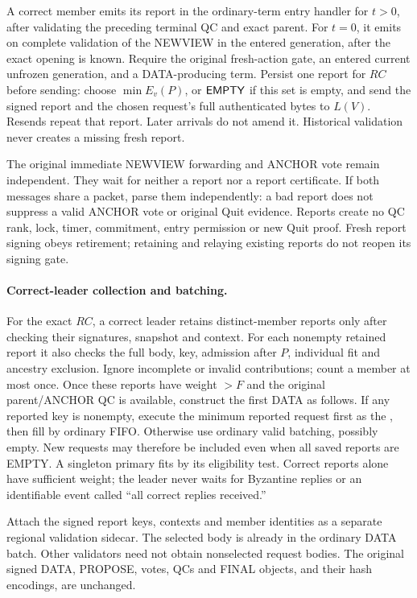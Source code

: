 A correct member emits its report in the ordinary-term entry handler
for $t>0$, after validating the preceding terminal QC and exact parent.
For $t=0$, it emits on complete validation of the NEWVIEW in the entered
generation, after the exact opening is known. Require the original
fresh-action gate, an entered current unfrozen generation, and a
DATA-producing term. Persist one report for $\mathit{RC}$ before sending:
choose $\min E_v(P)$, or $\mathsf{EMPTY}$ if this set is empty, and send the
signed report and the chosen request's full authenticated bytes to
$L(V)$. Resends repeat that report. Later arrivals do not amend it.
Historical validation never creates a missing fresh report.

The original immediate NEWVIEW forwarding and ANCHOR vote remain
independent. They wait for neither a report nor a report certificate.
If both messages share a packet, parse them independently: a bad report
does not suppress a valid ANCHOR vote or original Quit evidence.
Reports create no QC rank, lock, timer, commitment, entry permission or
new Quit proof. Fresh report signing obeys retirement; retaining and
relaying existing reports do not reopen its signing gate.

\paragraph{Correct-leader collection and batching.}
For the exact $\mathit{RC}$, a correct leader retains distinct-member
reports only after checking their signatures, snapshot and context.
For each nonempty retained report it also checks the full body, key,
admission after $P$, individual fit and ancestry exclusion. Ignore
incomplete or invalid contributions; count a member at most once.
Once these reports have weight $>F$ and the original parent/ANCHOR QC
is available, construct the first DATA as follows. If any reported key
is nonempty, execute the minimum reported request first as the
, then fill by ordinary FIFO. Otherwise use ordinary
valid batching, possibly empty. New requests may therefore be included
even when all saved reports are EMPTY. A singleton primary fits by its
eligibility test. Correct reports alone have sufficient weight; the
leader never waits for Byzantine replies or an identifiable event
called ``all correct replies received.''

Attach the signed report keys, contexts and member identities as a
separate regional validation sidecar. The selected body is already in
the ordinary DATA batch. Other validators need not obtain nonselected
request bodies. The original signed DATA, PROPOSE, votes, QCs and FINAL
objects, and their hash encodings, are unchanged.

